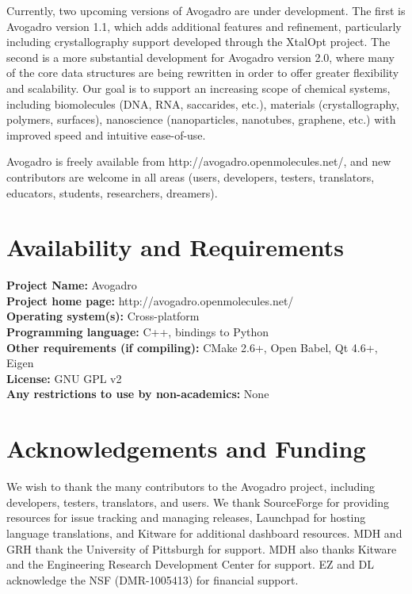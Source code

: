 \documentclass[10pt]{bmc_article}
\newenvironment{bmcformat}{\begin{raggedright}
\baselineskip20pt\sloppy\setboolean{publ}{false}}{\end{raggedright}
\baselineskip20pt\sloppy}
\begin{document}
\begin{bmcformat}
Currently, two upcoming versions of Avogadro are under development. The
first is Avogadro version 1.1, which adds additional features and
refinement, particularly including crystallography support developed
through the XtalOpt project. The second is a more substantial
development for Avogadro version 2.0, where many of the core data
structures are being rewritten in order to offer greater flexibility and
scalability. Our goal is to support an increasing scope of chemical
systems, including biomolecules (DNA, RNA, saccarides, etc.),
materials (crystallography, polymers, surfaces), nanoscience
(nanoparticles, nanotubes, graphene, etc.) with improved speed and
intuitive ease-of-use.

Avogadro is freely available from http://avogadro.openmolecules.net/,
and new contributors are welcome in all areas (users, developers,
testers, translators, educators, students, researchers, dreamers).

\section{Availability and Requirements}

\textbf{Project Name:} Avogadro \\
\textbf{Project home page:} http://avogadro.openmolecules.net/ \\
\textbf{Operating system(s):} Cross-platform \\
\textbf{Programming language:} C++, bindings to Python \\
\textbf{Other requirements (if compiling):} CMake 2.6+, Open Babel, Qt 4.6+, Eigen \\
\textbf{License:} GNU GPL v2 \\
\textbf{Any restrictions to use by non-academics:} None

\section{Acknowledgements and Funding}

We wish to thank the many contributors to the Avogadro project, including
developers, testers, translators, and users. We thank SourceForge for
providing resources for issue tracking and managing releases,
Launchpad for hosting language translations, and
Kitware for additional dashboard resources. MDH and GRH thank the
University of Pittsburgh for support. MDH also thanks Kitware and the
Engineering Research Development Center for support. EZ and DL acknowledge
the NSF (DMR-1005413) for financial support.


\end{bmcformat}
\end{document}
